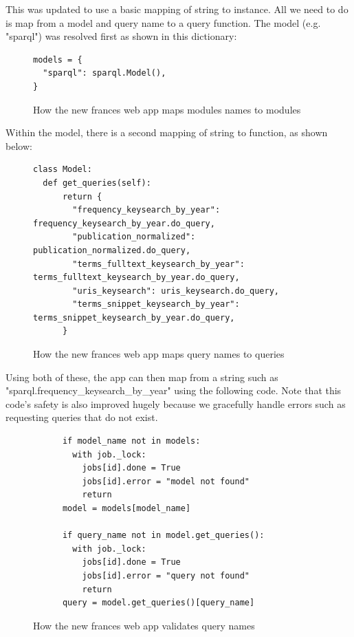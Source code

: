 \documentclass[12pt, letterpaper]{article}
\begin{document}
\begin{flushleft}
This was updated to use a basic mapping of string to instance. All we need to do is map from a model and query name to a query function. The model (e.g. "sparql") was resolved first as shown in this dictionary:
\end{flushleft}

\begin{flushleft}
\begin{figure}[H]
\begin{verbatim}
models = {
  "sparql": sparql.Model(),
}
\end{verbatim}
\caption{How the new frances web app maps modules names to modules}
\end{figure}
\end{flushleft}

Within the model, there is a second mapping of string to function, as shown below:

\begin{flushleft}
\begin{figure}[H]
\begin{verbatim}
class Model:
  def get_queries(self):
      return {
        "frequency_keysearch_by_year": frequency_keysearch_by_year.do_query,
        "publication_normalized": publication_normalized.do_query,
        "terms_fulltext_keysearch_by_year": terms_fulltext_keysearch_by_year.do_query,
        "uris_keysearch": uris_keysearch.do_query,
        "terms_snippet_keysearch_by_year": terms_snippet_keysearch_by_year.do_query,
      }
\end{verbatim}
\caption{How the new frances web app maps query names to queries}
\end{figure}
\end{flushleft}

\begin{flushleft}
Using both of these, the app can then map from a string such as "sparql.frequency\_keysearch\_by\_year" using the following code. Note that this code's safety is also improved hugely because we gracefully handle errors such as requesting queries that do not exist.
\end{flushleft}

\begin{flushleft}
\begin{figure}[H]
\begin{verbatim}
      if model_name not in models:
        with job._lock:
          jobs[id].done = True
          jobs[id].error = "model not found"
          return
      model = models[model_name]
      
      if query_name not in model.get_queries():
        with job._lock:
          jobs[id].done = True
          jobs[id].error = "query not found"
          return
      query = model.get_queries()[query_name]
\end{verbatim}
\caption{How the new frances web app validates query names}
\end{figure}
\end{flushleft}
\end{document}
